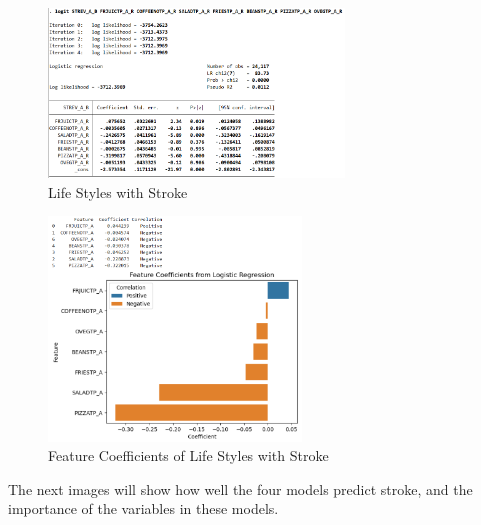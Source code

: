 \documentclass{article}
\begin{document}
\begin{figure}[!h]
	\centering
	\includegraphics[width=0.7\textwidth]{../Image/L_S.jpg}
	\caption{Life Styles with Stroke}
	\label{fig:G8}
\end{figure}
\newpage
\begin{figure}[!h]
	\centering
	\includegraphics[width=0.6\textwidth]{../Image/P36.jpg}
	\caption{Feature Coefficients of Life Styles with Stroke}
	\label{fig:P36}
\end{figure}

The next images will show how well the four models predict stroke, and the importance of the variables in these models.
\end{document}
